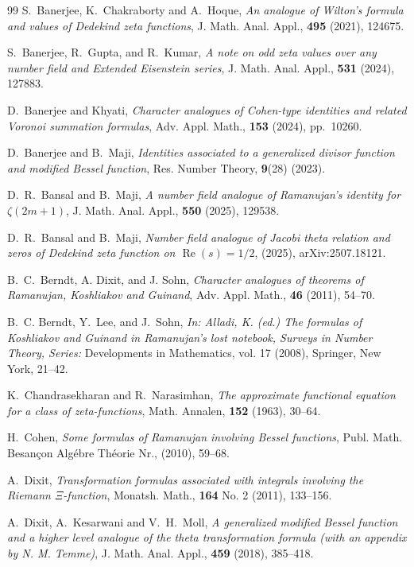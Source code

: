 \documentclass[12pt,reqno]{amsart}
\renewcommand{\Re}{\operatorname{Re}}
\renewcommand{\(}{\left\(}
\renewcommand{\)}{\right\)}
\renewcommand{\[}{\left\[}
\renewcommand{\]}{\right\]}
\numberwithin{equation}{section}
\theoremstyle{plain}
\begin{document}
\begin{thebibliography}{99}
S.~Banerjee, K.~Chakraborty and A.~Hoque, \emph{An analogue of Wilton’s formula and values of Dedekind zeta functions}, J.
Math. Anal. Appl., {\bf 495} (2021), 124675.

S.~Banerjee, R.~Gupta, and R.~Kumar,  \emph{A note on odd zeta values over any number field and Extended Eisenstein series},   J.  Math.   Anal.  Appl.,   {\bf 531}  (2024),  127883.

D.~Banerjee and Khyati, \emph{Character analogues of Cohen-type identities and related Voronoi summation formulas}, Adv. Appl. Math., {\bf 153} (2024), pp.~10260.

D.~Banerjee and B.~Maji, \emph{Identities associated to a generalized divisor function and modified Bessel function}, Res. Number Theory, {\bf 9}(28) (2023).

D.~R.~Bansal and B.~Maji, \emph{A number field analogue of Ramanujan’s identity for $\zeta(2m+1)$}, J. Math. Anal. Appl., {\bf 550} (2025), 129538.

D.~R.~Bansal and B.~Maji, \emph{Number field analogue of Jacobi theta relation and zeros of Dedekind zeta function on $\Re(s)= 1/2$},  (2025), arXiv:2507.18121.

B.~C.~Berndt, A. Dixit,  and J. Sohn, \emph{Character analogues of theorems of Ramanujan, Koshliakov and Guinand}, Adv. Appl. Math., {\bf 46} (2011), 54--70.

B.~C. Berndt, Y.~Lee, and J.~Sohn, \emph{In: Alladi, K. (ed.) The formulas of Koshliakov and Guinand in Ramanujan’s lost notebook, Surveys in Number Theory, Series:} Developments in Mathematics, vol. 17
(2008), Springer, New York, 21--42.  

K.~Chandrasekharan and R.~Narasimhan,  \emph {The approximate functional equation for a class of zeta-functions}, Math. Annalen, {\bf 152} (1963), 30--64.

H.~Cohen, \emph{Some formulas of Ramanujan involving Bessel functions}, Publ. Math. Besan\c{c}on Alg\'ebre Th\'eorie Nr., (2010), 59--68.

A.~Dixit, \emph{Transformation formulas associated with integrals involving the Riemann $\Xi$-function}, Monatsh.
Math., {\bf 164} No. 2 (2011), 133–156.

A.~Dixit, A.~Kesarwani and V.~H.~Moll, \emph{A generalized modified Bessel function and a higher level analogue of the theta transformation formula (with an appendix by N. M. Temme)}, J. Math. Anal. Appl., {\bf 459} (2018), 385--418.


\end{thebibliography}
\end{document}
